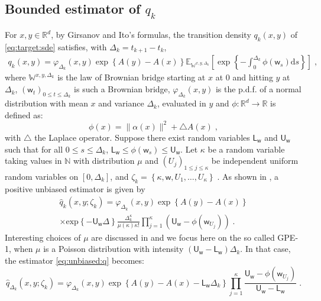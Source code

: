 \documentclass[12pt]{article}
\newcommand{\rmd}{\mathrm{d}}
\newcommand{\eqsp}{\;}
\newcommand{\1}{\mathrm{1}}
\newcommand{\mw}{\mathsf{w}}%
\newcommand{\U}{\mathsf{U}}
\newcommand{\Lo}{\mathsf{L}}
\begin{document}
\subsection*{Bounded estimator of $q_k$}
For $x, y \in \mathbb{R}^d$, by Girsanov and Ito's formulas, the transition density $q_k(x,y)$ of \eqref{eq:target:sde} satisfies, with $\Delta_k = t_{k+1}-t_k$,
\begin{align*}
q_k(x,y)=\varphi_{\Delta_k}(x,y)\exp\left\lbrace A(y)-A(x)\right\rbrace \mathbb{E}_{\mathbb{W}^{x,y,\Delta_k}}\left[ \exp \left\lbrace - \int_0^{\Delta_k} \phi(\mw_s)\rmd s \right\rbrace \right]\eqsp,
\end{align*}
where $\mathbb{W}^{x,y,\Delta_k}$ is the law of Brownian bridge starting at $x$ at 0 and hitting $y$ at $\Delta_k$, $(\mw_t)_{0\leq t \leq \Delta_k}$ is such a Brownian bridge, $\varphi_{\Delta_k}(x,y)$ is the p.d.f. of a normal distribution with mean $x$ and variance $\Delta_k$, evaluated in $y$ and $\phi:\mathbb{R}^d\to\mathbb{R}$ is defined as:
\[
\phi(x) =\|\alpha(x)\|^2  + \triangle A(x)\eqsp,
\]
with $\triangle$ the Laplace operator.
Suppose there exist random variables $\Lo_\mw$ and $\U_\mw$ such that for all $0\leq s \leq \Delta_k$, $\Lo_\mw \leq \phi(\mw_s)\leq \U_\mw$.
Let $\kappa$ be a random variable taking values in $\mathbb{N}$ with distribution $\mu$ and $(U_j)_{1\le j\le \kappa}$ be independent uniform random variables on $[0,\Delta_k]$, and $
\zeta_k = \left\{\kappa,\mw,U_1,\ldots,U_\kappa\right\}\eqsp$. 
As shown in \cite{fearnhead:papaspiliopoulos:roberts:2008}, a positive unbiased estimator is given by 
\begin{multline}
\widehat{q}_k(x,y;\zeta_k) = \varphi_{\Delta_k}(x,y) \exp \left\{A(y) - A(x)\right\}\\ 
\times\mathrm{exp}\left\{-\U_\mw\Delta\right\}\frac{\Delta_k^{\kappa}}{\mu(\kappa)\kappa!}\prod_{j=1}^{\kappa}\left(\U_\mw-\phi(\mw_{U_j})\right)\eqsp.\label{eq:unbiased:q}
\end{multline}
Interesting choices of $\mu$ are discussed in \cite{fearnhead:papaspiliopoulos:roberts:2008} and we focus here on the so called GPE-1, when $\mu$ is a Poisson distribution with intensity $(\U_\mw-\Lo_\mw)\Delta_k$. In that case, the estimator \eqref{eq:unbiased:q} becomes:
\begin{equation}
\widehat{q}_{\Delta_k}(x,y;\zeta_k) = \varphi_{\Delta_k}(x,y) \exp \left\{A(y) - A(x)- \Lo_\mw\Delta_k \right\}\prod_{j=1}^{\kappa}\frac{\U_\mw-\phi(\mw_{U_j})}{\U_\mw-\Lo_\mw}\eqsp.\label{eq:GPE1}
\end{equation}
\end{document}
